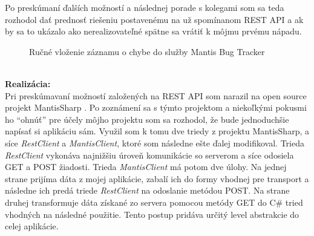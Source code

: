 \documentclass[slovak, bachelorpractice]{diploma}
\begin{document}
Po preskúmaní ďalších možností a následnej porade s kolegami som sa teda rozhodol dať prednosť riešeniu postavenému na už spomínanom REST API a ak by sa to ukázalo ako nerealizovateľné spätne sa vrátiť k môjmu prvému nápadu.
\vspace{-5pt}
\begin{figure}[!htbp]
	\centering
	\setlength{\fboxsep}{0pt}
	\setlength{\fboxrule}{1pt}
	\caption{Ručné vloženie záznamu o chybe do služby Mantis Bug Tracker}
	\label{pic:Mantis}
\end{figure} \\
\textbf{Realizácia:} \\ Pri preskúmavaní možností založených na REST API som narazil na open source projekt MantisSharp \cite{MantisSharp}. Po zoznámení sa s týmto projektom a niekoľkými pokusmi ho \enquote{ohnúť} pre účely môjho projektu som sa rozhodol, že bude jednoduchšie napísať si aplikáciu sám. Využil som k tomu dve triedy z projektu MantisSharp, a síce \textit{RestClient} a \textit{MantisClient}, ktoré som následne ešte ďalej modifikoval. Trieda \textit{RestClient} vykonáva najnižšiu úroveň komunikácie so serverom a síce odosiela GET a POST žiadosti. Trieda \textit{MantisClient} má potom dve úlohy. Na jednej strane prijíma dáta z mojej aplikácie, zabalí ich do formy vhodnej pre transport a následne ich predá triede \textit{RestClient} na odoslanie metódou POST. Na strane druhej transformuje dáta získané zo servera pomocou metódy GET do C\# tried vhodných na následné použitie. Tento postup pridáva určitý level abstrakcie do celej aplikácie.
\end{document}

